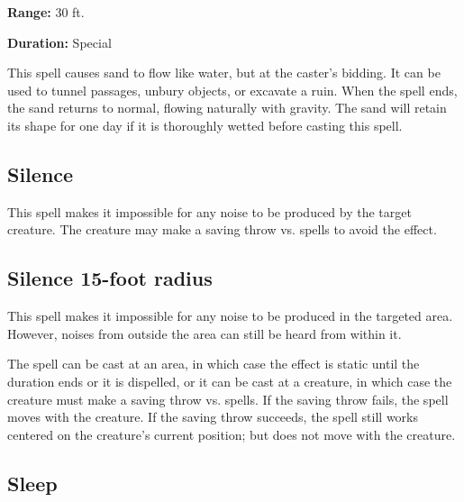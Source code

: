 \begin{multicols*}{2}
{\textbf{Range:} 30 ft.

\textbf{Duration:} Special}

This spell causes sand to flow like water, but at the caster's bidding. It can be used to tunnel passages, unbury objects, or excavate a ruin. When the spell ends, the sand returns to normal, flowing naturally with gravity. The sand will retain its shape for one day if it is thoroughly wetted before casting this spell.

\subsection{Silence}\label{spell:Silence}

This spell makes it impossible for any noise to be produced by the target creature. The creature may make a saving throw vs. spells to avoid the effect.

\subsection{Silence 15-foot radius}\label{spell:Silence 15-foot radius}

This spell makes it impossible for any noise to be produced in the targeted area. However, noises from outside the area can still be heard from within it.

The spell can be cast at an area, in which case the effect is static until the duration ends or it is dispelled, or it can be cast at a creature, in which case the creature must make a saving throw vs. spells. If the saving throw fails, the spell moves with the creature. If the saving throw succeeds, the spell still works centered on the creature’s current position; but does not move with the creature.

\subsection{Sleep}\label{spell:Sleep}
\end{multicols*}
